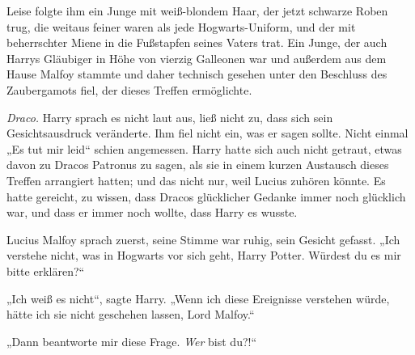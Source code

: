 Leise folgte ihm ein Junge mit weiß-blondem Haar, der jetzt schwarze Roben trug, die weitaus feiner waren als jede Hogwarts-Uniform, und der mit beherrschter Miene in die Fußstapfen seines Vaters trat. Ein Junge, der auch Harrys Gläubiger in Höhe von vierzig Galleonen war und außerdem aus dem Hause Malfoy stammte und daher technisch gesehen unter den Beschluss des Zaubergamots fiel, der dieses Treffen ermöglichte.

\emph{Draco.}
Harry sprach es nicht laut aus, ließ nicht zu, dass sich sein Gesichtsausdruck veränderte. Ihm fiel nicht ein, was er sagen sollte. Nicht einmal „Es tut mir leid“ schien angemessen. Harry hatte sich auch nicht getraut, etwas davon zu Dracos Patronus zu sagen, als sie in einem kurzen Austausch dieses Treffen arrangiert hatten; und das nicht nur, weil Lucius zuhören könnte. Es hatte gereicht, zu wissen, dass Dracos glücklicher Gedanke immer noch glücklich war, und dass er immer noch wollte, dass Harry es wusste.

Lucius Malfoy sprach zuerst, seine Stimme war ruhig, sein Gesicht gefasst. „Ich verstehe nicht, was in Hogwarts vor sich geht, Harry Potter. Würdest du es mir bitte erklären?“

„Ich weiß es nicht“, sagte Harry. „Wenn ich diese Ereignisse verstehen würde, hätte ich sie nicht geschehen lassen, Lord Malfoy.“

„Dann beantworte mir diese Frage. \emph{Wer} bist du?!“

